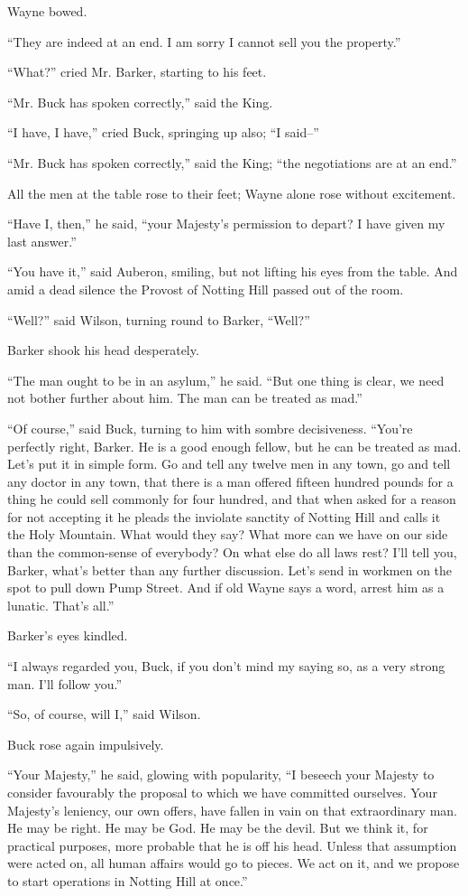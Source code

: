 \documentclass{book}
\begin{document}
Wayne bowed.

“They are indeed at an end. I am sorry I cannot sell you the property.”

“What?” cried Mr. Barker, starting to his feet.

“Mr. Buck has spoken correctly,” said the King.

“I have, I have,” cried Buck, springing up also; “I said–”

“Mr. Buck has spoken correctly,” said the King; “the negotiations are at an end.”

All the men at the table rose to their feet; Wayne alone rose without excitement.

“Have I, then,” he said, “your Majesty’s permission to depart? I have given my last answer.”

“You have it,” said Auberon, smiling, but not lifting his eyes from the table. And amid a dead silence the Provost of Notting Hill passed out of the room.

“Well?” said Wilson, turning round to Barker, “Well?”

Barker shook his head desperately.

“The man ought to be in an asylum,” he said. “But one thing is clear, we need not bother further about him. The man can be treated as mad.”

“Of course,” said Buck, turning to him with sombre decisiveness. “You’re perfectly right, Barker. He is a good enough fellow, but he can be treated as mad. Let’s put it in simple form. Go and tell any twelve men in any town, go and tell any doctor in any town, that there is a man offered fifteen hundred pounds for a thing he could sell commonly for four hundred, and that when asked for a reason for not accepting it he pleads the inviolate sanctity of Notting Hill and calls it the Holy Mountain. What would they say? What more can we have on our side than the common-sense of everybody? On what else do all laws rest? I’ll tell you, Barker, what’s better than any further discussion. Let’s send in workmen on the spot to pull down Pump Street. And if old Wayne says a word, arrest him as a lunatic. That’s all.”

Barker’s eyes kindled.

“I always regarded you, Buck, if you don’t mind my saying so, as a very strong man. I’ll follow you.”

“So, of course, will I,” said Wilson.

Buck rose again impulsively.

“Your Majesty,” he said, glowing with popularity, “I beseech your Majesty to consider favourably the proposal to which we have committed ourselves. Your Majesty’s leniency, our own offers, have fallen in vain on that extraordinary man. He may be right. He may be God. He may be the devil. But we think it, for practical purposes, more probable that he is off his head. Unless that assumption were acted on, all human affairs would go to pieces. We act on it, and we propose to start operations in Notting Hill at once.”
\end{document}
